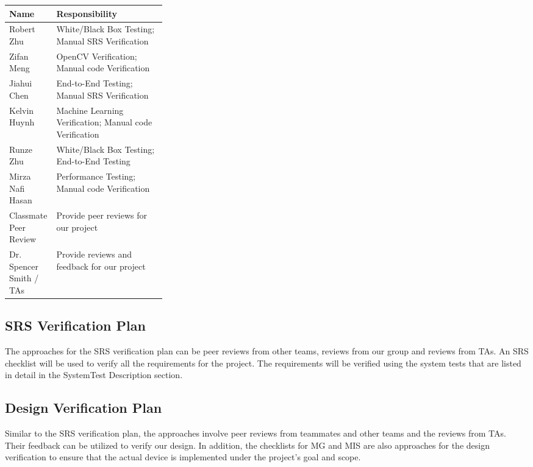 \documentclass[12pt]{article}
\begin{document}
\renewcommand{\arraystretch}{1.2}
\noindent \begin{tabularx}{\textwidth}{p{0.3\linewidth}|X}
\toprule
\textbf{Name} & \textbf{Responsibility}\\
\midrule
Robert Zhu
& White/Black Box Testing; Manual SRS Verification\\ \hline
Zifan Meng
& OpenCV Verification; Manual code Verification\\ \hline
Jiahui Chen
& End-to-End Testing; Manual SRS Verification\\ \hline
Kelvin Huynh
& Machine Learning Verification; Manual code Verification\\ \hline
Runze Zhu
& White/Black Box Testing; End-to-End Testing\\ \hline
Mirza Nafi Hasan
& Performance Testing; Manual code Verification\\ \hline
Classmate Peer Review
& Provide peer reviews for our project\\ \hline
Dr. Spencer Smith / TAs
& Provide reviews and feedback for our project\\
\bottomrule
\end{tabularx}

\subsection{SRS Verification Plan}
The approaches for the SRS verification plan can be peer reviews from other teams, reviews from our group and reviews from TAs. An SRS checklist will be used to verify all the requirements for the project. The requirements will be verified using the system tests that are listed in detail in the SystemTest Description section.


\subsection{Design Verification Plan}
Similar to the SRS verification plan, the approaches involve peer reviews from teammates and other teams and the reviews from TAs. Their feedback can be utilized to verify our design. In addition, the checklists for MG and MIS are also approaches for the design verification to ensure that the actual device is implemented under the project’s goal and scope.
\end{document}

